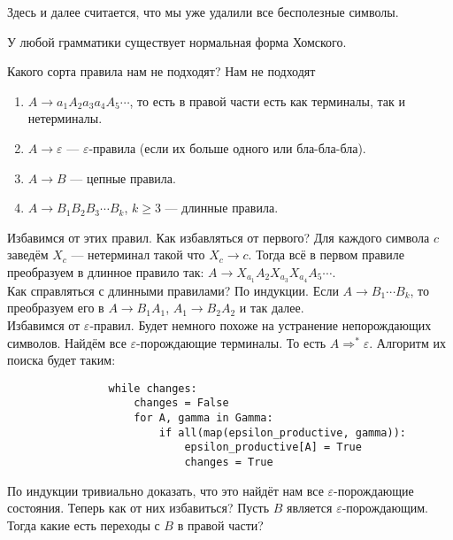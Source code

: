 \documentclass{article}
\begin{document}
\begin{itemize}
\begin{Comment}
        \end{Comment}
        \begin{Comment}
            Здесь и далее считается, что мы уже удалили все бесполезные символы.
        \end{Comment}
        \thm У любой грамматики существует нормальная форма Хомского.
        \begin{Proof}
            Какого сорта правила нам не подходят? Нам не подходят
            \begin{enumerate}
                \item $A\to a_1A_2a_3a_4A_5\cdots$, то есть в правой части есть как терминалы, так и нетерминалы.
                \item $A\to\varepsilon$ --- $\varepsilon$-правила (если их больше одного или бла-бла-бла).
                \item $A\to B$ --- цепные правила.
                \item $A\to B_1B_2B_3\cdots B_k$, $k\geqslant3$ --- длинные правила.
            \end{enumerate}
            Избавимся от этих правил. Как избавляться от первого? Для каждого символа $c$ заведём $X_c$ --- нетерминал такой что $X_c\to c$. Тогда всё в первом правиле преобразуем в длинное правило так: $A\to X_{a_1}A_2X_{a_3}X_{a_4}A_5\cdots$.\\
            Как справляться с длинными правилами? По индукции. Если $A\to B_1\cdots B_k$, то преобразуем его в $A\to B_1A_1$, $A_1\to B_2A_2$ и так далее.\\
            Избавимся от $\varepsilon$-правил. Будет немного похоже на устранение непорождающих символов. Найдём все $\varepsilon$-порождающие терминалы. То есть $A\Rightarrow^*\varepsilon$. Алгоритм их поиска будет таким:
            \begin{verbatim}
                while changes:
                    changes = False
                    for A, gamma in Gamma:
                        if all(map(epsilon_productive, gamma)):
                            epsilon_productive[A] = True
                            changes = True
            \end{verbatim}
            По индукции тривиально доказать, что это найдёт нам все $\varepsilon$-порождающие состояния. Теперь как от них избавиться? Пусть $B$ является $\varepsilon$-порождающим. Тогда какие есть переходы с $B$ в правой части?
            \begin{itemize}

\end{itemize}
\end{Proof}
\end{itemize}
\end{document}
